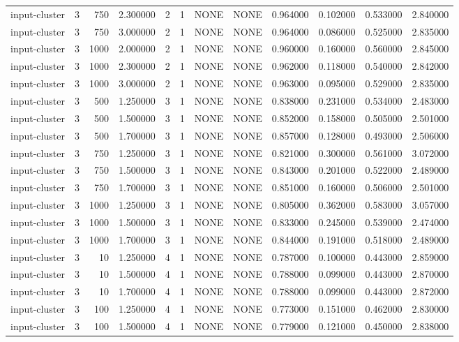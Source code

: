 \begin{tabular}{lrrrllllrrrr}
input-cluster & 3 & 750 & 2.300000 & 2 & 1 & NONE & NONE & 0.964000 & 0.102000 & 0.533000 & 2.840000 \\
input-cluster & 3 & 750 & 3.000000 & 2 & 1 & NONE & NONE & 0.964000 & 0.086000 & 0.525000 & 2.835000 \\
input-cluster & 3 & 1000 & 2.000000 & 2 & 1 & NONE & NONE & 0.960000 & 0.160000 & 0.560000 & 2.845000 \\
input-cluster & 3 & 1000 & 2.300000 & 2 & 1 & NONE & NONE & 0.962000 & 0.118000 & 0.540000 & 2.842000 \\
input-cluster & 3 & 1000 & 3.000000 & 2 & 1 & NONE & NONE & 0.963000 & 0.095000 & 0.529000 & 2.835000 \\
input-cluster & 3 & 500 & 1.250000 & 3 & 1 & NONE & NONE & 0.838000 & 0.231000 & 0.534000 & 2.483000 \\
input-cluster & 3 & 500 & 1.500000 & 3 & 1 & NONE & NONE & 0.852000 & 0.158000 & 0.505000 & 2.501000 \\
input-cluster & 3 & 500 & 1.700000 & 3 & 1 & NONE & NONE & 0.857000 & 0.128000 & 0.493000 & 2.506000 \\
input-cluster & 3 & 750 & 1.250000 & 3 & 1 & NONE & NONE & 0.821000 & 0.300000 & 0.561000 & 3.072000 \\
input-cluster & 3 & 750 & 1.500000 & 3 & 1 & NONE & NONE & 0.843000 & 0.201000 & 0.522000 & 2.489000 \\
input-cluster & 3 & 750 & 1.700000 & 3 & 1 & NONE & NONE & 0.851000 & 0.160000 & 0.506000 & 2.501000 \\
input-cluster & 3 & 1000 & 1.250000 & 3 & 1 & NONE & NONE & 0.805000 & 0.362000 & 0.583000 & 3.057000 \\
input-cluster & 3 & 1000 & 1.500000 & 3 & 1 & NONE & NONE & 0.833000 & 0.245000 & 0.539000 & 2.474000 \\
input-cluster & 3 & 1000 & 1.700000 & 3 & 1 & NONE & NONE & 0.844000 & 0.191000 & 0.518000 & 2.489000 \\
input-cluster & 3 & 10 & 1.250000 & 4 & 1 & NONE & NONE & 0.787000 & 0.100000 & 0.443000 & 2.859000 \\
input-cluster & 3 & 10 & 1.500000 & 4 & 1 & NONE & NONE & 0.788000 & 0.099000 & 0.443000 & 2.870000 \\
input-cluster & 3 & 10 & 1.700000 & 4 & 1 & NONE & NONE & 0.788000 & 0.099000 & 0.443000 & 2.872000 \\
input-cluster & 3 & 100 & 1.250000 & 4 & 1 & NONE & NONE & 0.773000 & 0.151000 & 0.462000 & 2.830000 \\
input-cluster & 3 & 100 & 1.500000 & 4 & 1 & NONE & NONE & 0.779000 & 0.121000 & 0.450000 & 2.838000 \\

\end{tabular}
